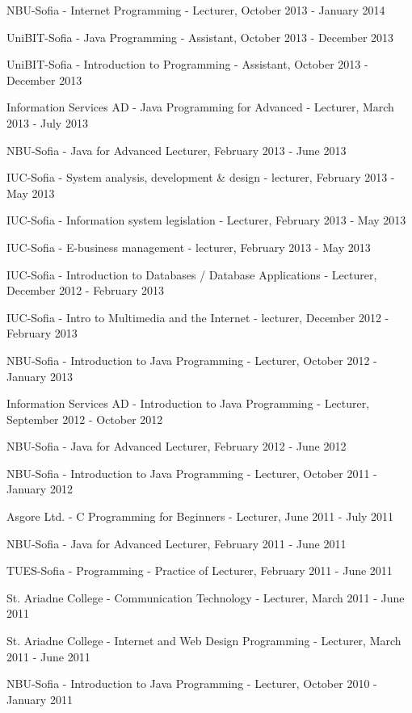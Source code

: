 \documentclass[english,a4paper]{europasscv}
\begin{document}
\begin{europasscv}
{\begin{ecvitemize}
    \item NBU-Sofia - Internet Programming - Lecturer, October 2013 - January 2014
    \item UniBIT-Sofia - Java Programming - Assistant, October 2013 - December 2013
    \item UniBIT-Sofia - Introduction to Programming - Assistant, October 2013 - December 2013
    \item Information Services AD - Java Programming for Advanced - Lecturer, March 2013 - July 2013
    \item NBU-Sofia - Java for Advanced Lecturer, February 2013 - June 2013
    \item IUC-Sofia - System analysis, development \& design - lecturer, February 2013 - May 2013
    \item IUC-Sofia - Information system legislation - Lecturer, February 2013 - May 2013
    \item IUC-Sofia - E-business management - lecturer, February 2013 - May 2013
    \item IUC-Sofia - Introduction to Databases / Database Applications - Lecturer, December 2012 - February 2013
    \item IUC-Sofia - Intro to Multimedia and the Internet - lecturer, December 2012 - February 2013
        \item NBU-Sofia - Introduction to Java Programming - Lecturer, October 2012 - January 2013
    \item Information Services AD - Introduction to Java Programming - Lecturer, September 2012 - October 2012
    \item NBU-Sofia - Java for Advanced Lecturer, February 2012 - June 2012
    \item NBU-Sofia - Introduction to Java Programming - Lecturer, October 2011 - January 2012
    \item Asgore Ltd. - C Programming for Beginners - Lecturer, June 2011 - July 2011
    \item NBU-Sofia - Java for Advanced Lecturer, February 2011 - June 2011
    \item TUES-Sofia - Programming - Practice of Lecturer, February 2011 - June 2011
    \item St. Ariadne College - Communication Technology - Lecturer, March 2011 - June 2011
    \item St. Ariadne College - Internet and Web Design Programming - Lecturer, March 2011 - June 2011
    \item NBU-Sofia - Introduction to Java Programming - Lecturer, October 2010 - January 2011

\end{ecvitemize}}
\end{europasscv}
\end{document}
